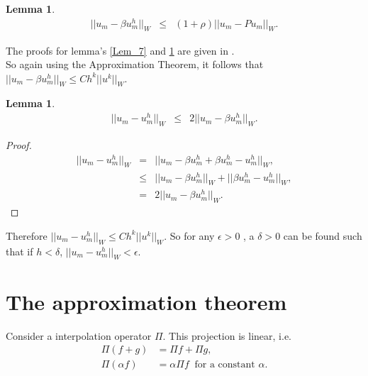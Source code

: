 \documentclass[../../main.tex]{subfiles}
\begin{document}
\newtheorem{Lem_8}[Lem_1]{Lemma} 
\begin{Lem_8}
	\label{Lem_8}
	\begin{eqnarray*}
		||u_{m} - \beta u_{m}^{h}||_{W} &\leq & \left(1+\rho\right)||u_{m}-Pu_{m}||_{W}.
	\end{eqnarray*}
\end{Lem_8}
\begin{comment}
\begin{proof}
	\begin{eqnarray*}
	||u_{m} - \beta u_{m}^{h}||_{W} & \leq & ||u_{m}-Pu_{m}||_{W} + ||Pu_{m} - \beta u_{m}^{h}||_{W} \\
				& \leq & \left(1+\rho\right)||u_{m}-Pu_{m}||_{W} \ \ \textrm{ (by Lemma \ref{Lem_7})}
	\end{eqnarray*}
\end{proof}
\end{comment}

The proofs for lemma's \ref{Lem_7} and \ref{Lem_8} are given in \cite{SF73}.\\

So again using the Approximation Theorem, it follows that $||u_{m} - \beta u_{m}^{h}||_{W}\leq Ch^{k}||u^{k}||_{W}$.


\newtheorem{Lem_9}[Lem_1]{Lemma} 
\begin{Lem_9}
	\label{Lem_9}
	\begin{eqnarray*}
		||u_{m} -  u_{m}^{h}||_{W} &\leq & 2||u_{m}-\beta u^{h}_{m}||_{W}.
	\end{eqnarray*}
\end{Lem_9}
\begin{proof}
	\begin{eqnarray*}
	||u_{m} - u_{m}^{h}||_{W} &=& ||u_{m} - \beta u_{m}^{h} + \beta u_{m}^{h} - u_{m}^{h}||_{W}, \\
						& \leq & ||u_{m} - \beta u_{m}^{h}||_{W} + ||\beta u_{m}^{h} - u_{m}^{h}||_{W}, \\
						& = & 2||u_{m} - \beta u_{m}^{h}||_{W}.	
	\end{eqnarray*}
\end{proof}

Therefore $||u_{m} -  u_{m}^{h}||_{W} \leq Ch^{k}||u^{k}||_{W}$. So for any $\epsilon >0$ , a $\delta >0$ can be found such that if $h < \delta$, $||u_{m} -  u_{m}^{h}||_{W} < \epsilon$.

\section{The approximation theorem} \label{sec:approximation_theorem}
Consider a interpolation operator $\Pi$.\label{sym:interpolation} This projection is linear, i.e.
\begin{align*}
	\Pi(f + g) & = \Pi f + \Pi g,\\
	\Pi(\alpha f) & = \alpha \Pi f \ \text{ for a constant } \alpha. 
\end{align*}
\end{document}
